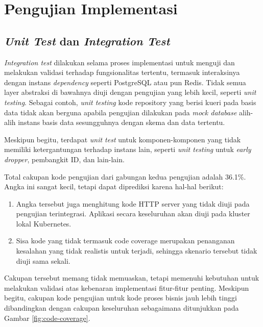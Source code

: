 \chapter{Pengujian Implementasi}
\label{apx:implementation-test}

\section{\textit{Unit Test} dan \textit{Integration Test}}

\textit{Integration test} dilakukan selama proses implementasi untuk menguji dan melakukan validasi terhadap fungsionalitas tertentu, termasuk interaksinya dengan instans \textit{dependency} seperti PostgreSQL atau pun Redis. Tidak semua layer abstraksi di bawahnya diuji dengan pengujian yang lebih kecil, seperti \textit{unit testing}. Sebagai contoh, \textit{unit testing} kode repository yang berisi kueri pada basis data tidak akan berguna apabila pengujian dilakukan pada \textit{mock database} alih-alih instans basis data sesungguhnya dengan skema dan data tertentu.

Meskipun begitu, terdapat \textit{unit test} untuk komponen-komponen yang tidak memiliki ketergantungan terhadap instans lain, seperti \textit{unit testing} untuk \textit{early dropper}, pembangkit ID, dan lain-lain.

Total cakupan kode pengujian dari gabungan kedua pengujian adalah 36.1\%. Angka ini sangat kecil, tetapi dapat diprediksi karena hal-hal berikut:

\begin{enumerate}
    \item Angka tersebut juga menghitung kode HTTP server yang tidak diuji pada pengujian terintegrasi. Aplikasi secara keseluruhan akan diuji pada kluster lokal Kubernetes.
    \item Sisa kode yang tidak termasuk code coverage merupakan penanganan kesalahan yang tidak realistis untuk terjadi, sehingga skenario tersebut tidak diuji sama sekali.
\end{enumerate}

Cakupan tersebut memang tidak memuaskan, tetapi memenuhi kebutuhan untuk melakukan validasi atas kebenaran implementasi fitur-fitur penting. Meskipun begitu, cakupan kode pengujian untuk kode proses bisnis jauh lebih tinggi dibandingkan dengan cakupan keseluruhan sebagaimana ditunjukkan pada Gambar \ref{fig:code-coverage}.

